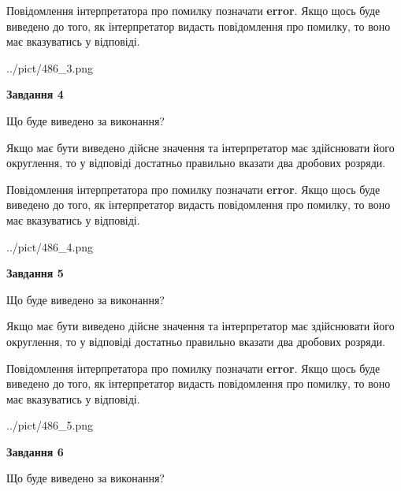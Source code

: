 \documentclass[12pt, ukrainian]{article}
\begin{document}
{\begin {Large}
Повідомлення інтерпретатора про помилку позначати \textbf{error}.
Якщо щось буде виведено до того, як інтерпретатор видасть повідомлення про помилку, 
то воно має вказуватись у відповіді. \par

\begin{center}
	{../pict/486_3.png}
\end{center}
\newpage

{\begin {center}\textbf{Завдання 4}\end {center}}\par
Що буде виведено за виконання? \par

Якщо має бути виведено дійсне значення та інтерпретатор має здійснювати його округлення, 
то у відповіді достатньо правильно вказати два дробових розряди.

Повідомлення інтерпретатора про помилку позначати \textbf{error}.
Якщо щось буде виведено до того, як інтерпретатор видасть повідомлення про помилку, 
то воно має вказуватись у відповіді. \par

\begin{center}
	{../pict/486_4.png}
\end{center}
\newpage

{\begin {center}\textbf{Завдання 5}\end {center}}\par
Що буде виведено за виконання? \par

Якщо має бути виведено дійсне значення та інтерпретатор має здійснювати його округлення, 
то у відповіді достатньо правильно вказати два дробових розряди.

Повідомлення інтерпретатора про помилку позначати \textbf{error}.
Якщо щось буде виведено до того, як інтерпретатор видасть повідомлення про помилку, 
то воно має вказуватись у відповіді. \par

\begin{center}
	{../pict/486_5.png}
\end{center}
\newpage

{\begin {center}\textbf{Завдання 6}\end {center}}\par
Що буде виведено за виконання? \par


\end{Large}}
\end{document}
